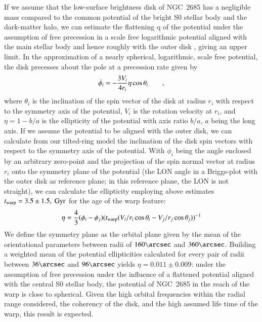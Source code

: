 \documentclass[oldversion]{aa}
\begin{document}
If we assume that the low-surface brightness disk of NGC~2685 has a
negligible mass compared to the common potential of the bright S0
stellar body and the dark-matter halo, we can estimate the flattening
q of the potential under the assumption of free precession in a scale
free logarithmic potential aligned with the main stellar body and
hence roughly with the outer  disk \citep[][]{Morganti06},
giving an upper limit. In the approximation of a nearly spherical,
logarithmic, scale free potential, the disk precesses about the pole
at a precession rate given by \citep[][]{Sparke86,Cox06}
%
\begin{equation}
\dot{\phi_i} = -\frac{3V_i}{4r_i}\eta \cos \theta_i\qquad {\rm ,}
\end{equation}
%
where $\theta_i$ is the inclination of the spin vector of the disk at
radius $r_i$ with respect to the symmetry axis of the potential, $V_i$
is the rotation velocity at $r_i$, and $\eta=1-b/a$ is the ellipticity
of the potential with axis ratio $b/a$, $a$ being the long axis. If we
assume the potential to be aligned with the outer disk, we can
calculate from our tilted-ring model the inclination of the disk spin
vectors with respect to the symmetry axis of the potential. With
$\phi_i$ being the angle enclosed by an arbitrary zero-point and the
projection of the spin normal vector at radius $r_i$ onto the symmetry
plane of the potential (the LON angle in a Briggs-plot with the outer
disk as reference plane; in this reference plane, the LON is not
straight), we can calculate the ellipticity employing above estimates
$t_{\rm warp}=3.5\pm1.5,\ \rm Gyr$ for the age of the warp feature:
\begin{equation}
\eta = \frac{4}{3}(\phi_i-\phi_j)(t_{\rm warp}(V_i/r_i \cos \theta_i -V_j/r_j \cos \theta_j))^{-1}
\end{equation}
We define the symmetry plane as the orbital plane given by the mean of
the orientational parameters between radii of $160\arcsec$ and
$360\arcsec$. Building a weighted mean of the potential ellipticities
calculated for every pair of radii between $36\arcsec$ and $96\arcsec$
yields $\eta = 0.011 \pm 0.009$: under the assumption of free
precession under the influence of a flattened potential aligned with
the central S0 stellar body, the potential of NGC~2685 in the reach of
the warp is close to spherical. Given the high orbital frequencies
within the radial range considered, the coherency of the disk, and the
high assumed life time of the warp, this result is expected.
\end{document}

